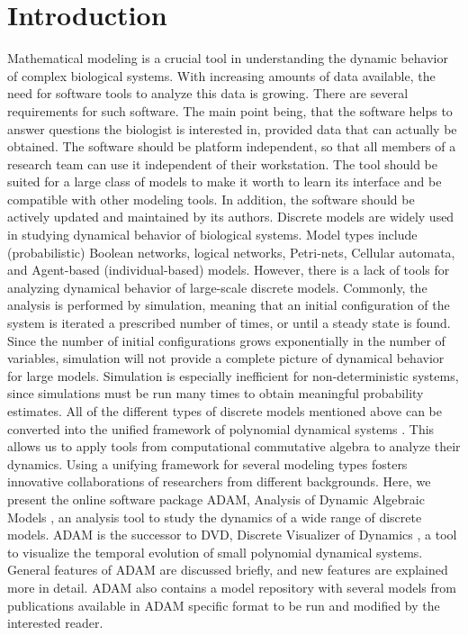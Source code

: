 \documentclass[11pt]{amsart}
\begin{document}
\section{Introduction}
Mathematical modeling is a crucial tool in understanding the dynamic behavior of complex
biological systems. With increasing amounts of data available, the need for software tools to analyze this data is growing. There are several requirements for such software. The main point being, that the software helps to answer questions the biologist is interested in, provided data that can actually be obtained. The software should be platform independent, so that all members of a research team can use it independent of their workstation. The tool should be suited for a large class of models to make it worth to learn its interface and be compatible with other modeling tools. In addition, the software should be actively updated and maintained by its authors.
Discrete models are widely used in studying dynamical behavior of biological systems. Model types include
(probabilistic) Boolean networks, logical networks, Petri-nets, Cellular
automata, and Agent-based (individual-based) models.
However, there is a lack of tools
for analyzing dynamical behavior of large-scale discrete models. Commonly, the analysis is performed by simulation, meaning that an
initial configuration of the system is iterated a prescribed number of times, or until a
steady state is found. Since the number of initial configurations grows exponentially in the number of variables, simulation
will not provide a complete picture of dynamical behavior for large models.
Simulation is especially inefficient for non-deterministic
systems, since simulations must be run many times to obtain meaningful
probability estimates.
All of the different types of discrete models mentioned above can be
converted into the unified framework of polynomial dynamical systems
\cite{Alan:Bioinf2010, Hinkelmann:2010}. This allows us to apply tools from
computational commutative algebra to analyze their dynamics. Using a unifying framework for several modeling types fosters innovative collaborations of researchers from different backgrounds.
Here, we present the online software package ADAM, Analysis of Dynamic Algebraic Models \cite{ADAM}, an analysis tool to study the dynamics of a wide range of discrete models. ADAM is the successor to DVD, Discrete Visualizer of Dynamics \cite{DVD}, a tool to visualize the temporal evolution of small polynomial dynamical systems.
General features of ADAM are discussed briefly, and new features are explained more in detail. ADAM also contains a model repository with several models from publications available in ADAM specific format to be run and modified by the interested reader.
\end{document}
